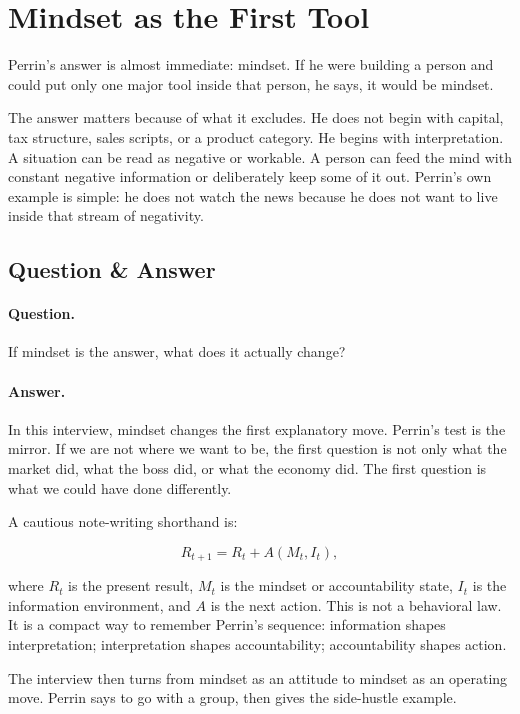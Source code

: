 \section{Mindset as the First Tool}

Perrin's answer is almost immediate: mindset. If he were building a person and could put only one major tool inside that person, he says, it would be mindset.

The answer matters because of what it excludes. He does not begin with capital, tax structure, sales scripts, or a product category. He begins with interpretation. A situation can be read as negative or workable. A person can feed the mind with constant negative information or deliberately keep some of it out. Perrin's own example is simple: he does not watch the news because he does not want to live inside that stream of negativity.

\subsection{Question \& Answer}

\paragraph{Question.}
If mindset is the answer, what does it actually change?

\paragraph{Answer.}
In this interview, mindset changes the first explanatory move. Perrin's test is the mirror. If we are not where we want to be, the first question is not only what the market did, what the boss did, or what the economy did. The first question is what we could have done differently.

A cautious note-writing shorthand is:

\begin{equation}
R_{t+1}
=
R_t
+
A\!\left(M_t,I_t\right),
\end{equation}

where \(R_t\) is the present result, \(M_t\) is the mindset or accountability state, \(I_t\) is the information environment, and \(A\) is the next action. This is not a behavioral law. It is a compact way to remember Perrin's sequence: information shapes interpretation; interpretation shapes accountability; accountability shapes action.

The interview then turns from mindset as an attitude to mindset as an operating move. Perrin says to go with a group, then gives the side-hustle example.

